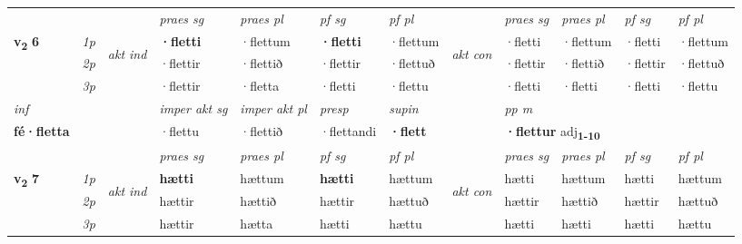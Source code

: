 \begin{longtable}[l]{X>{\footnotesize\itshape}llXXXXlXXXX}
\midrule

 & &   & \textit{praes sg}  & \textit{praes pl}    & \textit{ pf sg} & \textit{pf pl} & & \textit{praes sg}  & \textit{praes pl}    & \textit{pf sg} & \textit{pf pl }  \\ \cmidrule{4-7} \cmidrule{9-12}
 \multirow{2}{*}{{{\textbf{v{\textsubscript{2}}} \Large{\textbf{6}}}}}  & 1p & \multirow{3}{*}{\begin{turn}{90}\textit{akt ind}\end{turn}} & \textbf{·fletti} & ·flettum & \textbf{·fletti} & ·flettum & \multirow{3}{*}{\begin{turn}{90}\textit{akt con}\end{turn}} &·fletti & ·flettum & ·fletti & ·flettum\\*
 & 2p &  &  ·flettir  & ·flettið & ·flettir & ·flettuð & & ·flettir & ·flettið & ·flettir & ·flettuð \\*
 & 3p &  & ·flettir & ·fletta & ·fletti & ·flettu & & ·fletti & ·fletti& ·fletti & ·flettu \\*
\cmidrule{4-7} \cmidrule{9-12}

   {\textit{inf}} & &  & \textit{imper akt sg} & \textit{imper akt pl}   & \textit{presp} & \textit{supin}  && \textit{pp m} \\*
  {\textbf{fé\allowbreak ·fletta}} & && ·flettu  & ·flettið   & ·flettandi &  \textbf{·flett}  && \multicolumn{2}{l}{\textbf{·flettur} adj\textbf{\textsubscript{1-10}}} \\*

\midrule

 & &   & \textit{praes sg}  & \textit{praes pl}    & \textit{ pf sg} & \textit{pf pl} & & \textit{praes sg}  & \textit{praes pl}    & \textit{pf sg} & \textit{pf pl }  \\ \cmidrule{4-7} \cmidrule{9-12}
 \multirow{2}{*}{{{\textbf{v{\textsubscript{2}}} \Large{\textbf{7}}}}}  & 1p & \multirow{3}{*}{\begin{turn}{90}\textit{akt ind}\end{turn}} & \textbf{hætti} & hættum & \textbf{hætti} & hættum & \multirow{3}{*}{\begin{turn}{90}\textit{akt con}\end{turn}} &hætti & hættum & hætti & hættum\\*
 & 2p &  &  hættir  & hættið & hættir & hættuð & & hættir & hættið & hættir & hættuð \\*
 & 3p &  & hættir & hætta & hætti & hættu & & hætti & hætti& hætti & hættu \\*
\cmidrule{4-7} \cmidrule{9-12}


\end{longtable}
